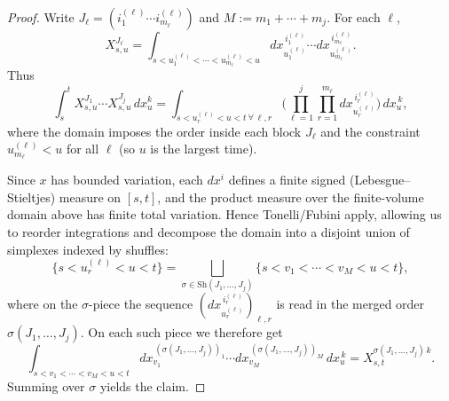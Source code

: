 \documentclass[12pt]{article}
\theoremstyle{remark}
\begin{document}
\begin{proof}
Write $J_\ell=(i^{(\ell)}_1\cdots i^{(\ell)}_{m_\ell})$ and $M:=m_1+\cdots+m_j$.
For each $\ell$,
\[
X^{J_\ell}_{s,u}
=\int_{s<u^{(\ell)}_1<\cdots<u^{(\ell)}_{m_\ell}<u}
dx^{\,i^{(\ell)}_1}_{u^{(\ell)}_1}\cdots dx^{\,i^{(\ell)}_{m_\ell}}_{u^{(\ell)}_{m_\ell}}.
\]
Thus
\[
\int_s^t X^{J_1}_{s,u}\cdots X^{J_j}_{s,u}\,dx^k_u
=
\int_{s<u^{(\ell)}_r<u<t\ \forall\,\ell,r}
\Big(\prod_{\ell=1}^j\prod_{r=1}^{m_\ell} dx^{\,i^{(\ell)}_r}_{u^{(\ell)}_r}\Big)\,dx^{\,k}_u,
\]
where the domain imposes the order inside each block $J_\ell$ and the constraint $u^{(\ell)}_{m_\ell}<u$ for all $\ell$ (so $u$ is the largest time).

Since $x$ has bounded variation, each $dx^i$ defines a finite signed (Lebesgue–Stieltjes) measure on $[s,t]$, and the product measure over the finite-volume domain above has finite total variation. Hence Tonelli/Fubini apply, allowing us to reorder integrations and decompose the domain into a disjoint union of simplexes indexed by shuffles:
\[
\big\{s< u^{(\ell)}_r < u < t\big\}
=\bigsqcup_{\sigma\in\mathrm{Sh}(J_1,\ldots,J_j)}
\big\{s< v_1<\cdots<v_M<u<t\big\},
\]
where on the $\sigma$-piece the sequence
\(
(dx^{\,i^{(\ell)}_r}_{u^{(\ell)}_r})_{\ell,r}
\)
is read in the merged order $\sigma(J_1,\ldots,J_j)$.
On each such piece we therefore get
\[
\int_{s<v_1<\cdots<v_M<u<t}
dx^{\,(\sigma(J_1,\ldots,J_j))_1}_{v_1}\cdots
dx^{\,(\sigma(J_1,\ldots,J_j))_M}_{v_M}\,dx^{\,k}_u
=
X^{\sigma(J_1,\ldots,J_j)\,k}_{s,t}.
\]
Summing over $\sigma$ yields the claim.
\end{proof}
\end{document}
